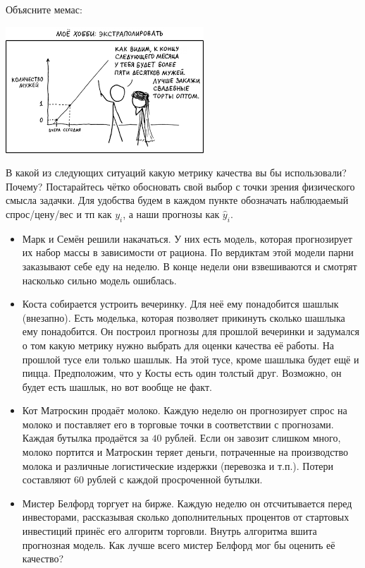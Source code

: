 \documentclass[12pt, a4paper, oneside]{article}
\theoremstyle{plain} %
\theoremstyle{definition}
\begin{document}
\begin{problem}{ }
Объясните мемас: 

\begin{center}
	\includegraphics[scale=0.8]{memes.png}
\end{center}
\end{problem}


\begin{problem}{ }
В какой	из следующих ситуаций какую метрику качества вы бы использовали?  Почему? Постарайтесь чётко обосновать свой выбор с точки зрения физического смысла задачки. Для удобства будем в каждом пункте обозначать наблюдаемый спрос/цену/вес и тп как  $y_i$, а наши прогнозы как  $\hat y_i$.


\begin{itemize} 
	\item Марк и Семён решили накачаться. У них есть модель, которая прогнозирует их набор массы в зависимости от рациона. По вердиктам этой модели парни заказывают себе еду на неделю. В конце недели они взвешиваются и смотрят насколько сильно модель ошиблась.
	
	\item Коста собирается устроить вечеринку. Для неё ему понадобится шашлык  (внезапно). Есть моделька, которая позволяет прикинуть сколько шашлыка ему понадобится. Он построил прогнозы для прошлой вечеринки и задумался о том какую метрику нужно выбрать для оценки качества её работы. На прошлой тусе ели только шашлык. На этой тусе, кроме шашлыка будет ещё и пицца.  Предположим, что у Косты есть один толстый друг. Возможно, он будет есть шашлык, но вот вообще не факт. 

	\item  Кот Матроскин продаёт молоко. Каждую неделю он прогнозирует спрос на молоко и поставляет его в торговые точки в соответствии с прогнозами. Каждая бутылка продаётся за $40$ рублей. Если он завозит слишком много, молоко портится и Матроскин теряет деньги, потраченные на производство молока и различные логистические издержки (перевозка и т.п.). Потери составляют $60$ рублей с каждой просроченной бутылки. 
	
	\item Мистер Белфорд торгует на бирже. Каждую неделю он отсчитывается перед инвесторами, рассказывая сколько дополнительных процентов от стартовых инвестиций принёс его алгоритм торговли. Внутрь алгоритма вшита прогнозная модель. Как лучше всего мистер Белфорд мог бы оценить её качество? 
\end{itemize} 
\end{problem}




\end{document}
